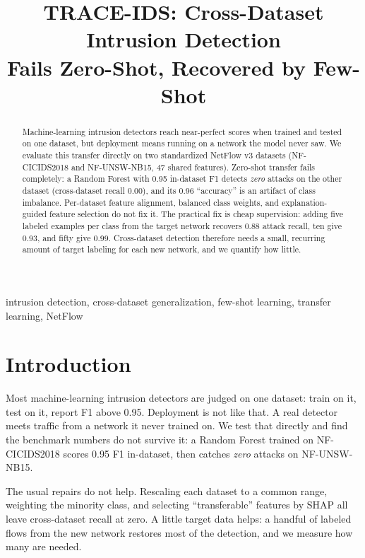 \documentclass[conference]{IEEEtran}
\begin{document}
\title{TRACE-IDS: Cross-Dataset Intrusion Detection\\Fails Zero-Shot, Recovered by Few-Shot}
\author{
}
\maketitle

\begin{abstract}
Machine-learning intrusion detectors reach near-perfect scores when trained and tested on one
dataset, but deployment means running on a network the model never saw. We evaluate this transfer
directly on two standardized NetFlow v3 datasets (NF-CICIDS2018 and NF-UNSW-NB15, 47 shared
features). Zero-shot transfer fails completely: a Random Forest with 0.95 in-dataset F1 detects
\emph{zero} attacks on the other dataset (cross-dataset recall 0.00), and its 0.96 ``accuracy'' is
an artifact of class imbalance. Per-dataset feature alignment, balanced class weights, and
explanation-guided feature selection do not fix it. The practical fix is cheap supervision: adding
five labeled examples per class from the target network recovers 0.88 attack recall, ten give 0.93,
and fifty give 0.99. Cross-dataset detection therefore needs a small, recurring amount of target
labeling for each new network, and we quantify how little.
\end{abstract}

\begin{IEEEkeywords}
intrusion detection, cross-dataset generalization, few-shot learning, transfer learning, NetFlow
\end{IEEEkeywords}

\section{Introduction}
Most machine-learning intrusion detectors are judged on one dataset: train on it, test on it,
report F1 above 0.95. Deployment is not like that. A real detector meets traffic from a network it
never trained on. We test that directly and find the benchmark numbers do not survive it: a Random
Forest trained on NF-CICIDS2018 scores 0.95 F1 in-dataset, then catches \emph{zero} attacks on
NF-UNSW-NB15.

The usual repairs do not help. Rescaling each dataset to a common range, weighting the minority
class, and selecting ``transferable'' features by SHAP all leave cross-dataset recall at zero. A
little target data helps: a handful of labeled flows from the new network restores most of the
detection, and we measure how many are needed.
\end{document}
